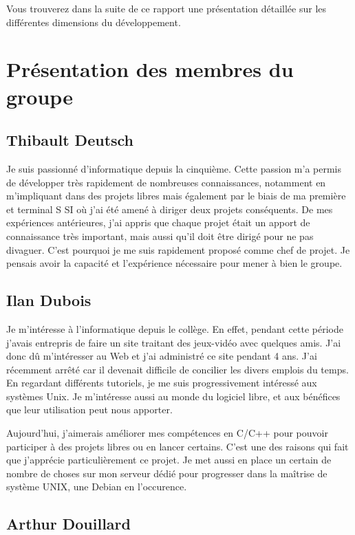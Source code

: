 \documentclass[11pt]{report}
\begin{document}
Vous trouverez dans la suite de ce rapport une présentation détaillée sur les différentes dimensions du développement.

\newpage
\section{Présentation des membres du groupe}

\subsection{Thibault Deutsch}

Je suis passionné d’informatique depuis la cinquième. Cette passion m’a permis de développer très rapidement de nombreuses connaissances, notamment en m’impliquant dans des projets libres mais également par le biais de ma première et terminal S SI où j’ai été amené à diriger deux projets conséquents. De mes expériences antérieures, j’ai appris que chaque projet était un apport de connaissance très important, mais aussi qu’il doit être dirigé pour ne pas divaguer. C’est pourquoi je me suis rapidement proposé comme chef de projet. Je pensais avoir la capacité et l’expérience nécessaire pour mener à bien le groupe.


\subsection{Ilan Dubois}

Je m’intéresse à l’informatique depuis le collège. En effet, pendant cette période j’avais entrepris de faire un site traitant des jeux-vidéo avec quelques amis. J’ai donc dû m’intéresser au Web et j’ai administré ce site pendant 4 ans. J’ai récemment arrêté car il devenait difficile de concilier les divers emplois du temps. En regardant différents tutoriels, je me suis progressivement intéressé aux systèmes Unix. Je m’intéresse aussi au monde du logiciel libre, et aux bénéfices que leur utilisation peut nous apporter.

Aujourd'hui, j'aimerais améliorer mes compétences en C/C++ pour pouvoir participer à des projets libres ou en lancer certains. C'est une des raisons qui fait que j'apprécie particulièrement ce projet. Je met aussi en place un certain de nombre de choses sur mon serveur dédié pour progresser dans la maîtrise de système UNIX, une Debian en l'occurence.

\subsection{Arthur Douillard}
\end{document}
